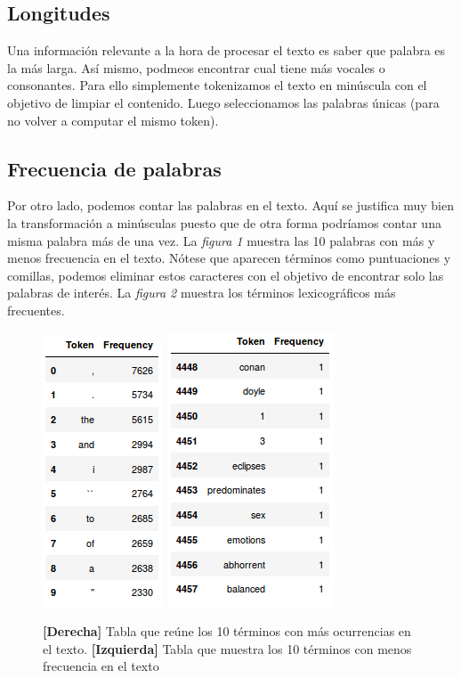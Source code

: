 \documentclass[conference]{IEEEtran}
\begin{document}
\subsection{Longitudes}
Una información relevante a la hora de procesar el texto es saber que palabra es la más larga. Así mismo, podmeos encontrar cual tiene más vocales o consonantes. Para ello simplemente tokenizamos el texto en minúscula con el objetivo de limpiar el contenido. Luego seleccionamos las palabras únicas (para no volver a computar el mismo token).

\subsection{Frecuencia de palabras}
Por otro lado, podemos contar las palabras en el texto. Aquí se justifica muy bien la transformación a minúsculas puesto que de otra forma podríamos contar una misma palabra más de una vez. La \textit{figura 1} muestra las 10 palabras con más y menos frecuencia en el texto. Nótese que aparecen términos como puntuaciones y comillas, podemos eliminar estos caracteres con el objetivo de encontrar solo las palabras de interés. La \textit{figura 2} muestra los términos lexicográficos más frecuentes.
\begin{figure}
\begin{center}
\includegraphics[scale=0.5]{img/1.png}
\hspace{2cm}
\includegraphics[scale=0.5]{img/2.png} 
\end{center}
\caption{\textbf{[Derecha]} Tabla que reúne los 10 términos con más ocurrencias en el texto. \textbf{[Izquierda]} Tabla que muestra los 10 términos con menos frecuencia en el texto}
\end{figure}
\end{document}
